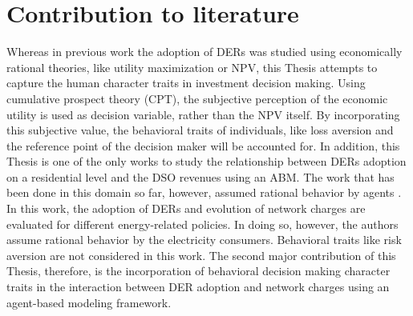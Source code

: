 \section{Contribution to literature}
Whereas in previous work the adoption of DERs was studied using economically rational theories, like utility maximization or NPV, this Thesis attempts to capture the human character traits in investment decision making. Using cumulative prospect theory (CPT), the subjective perception of the economic utility is used as decision variable, rather than the NPV itself. By incorporating this subjective value, the behavioral traits of individuals, like loss aversion and the reference point of the decision maker will be accounted for. 
\newline \newline \noindent
In addition, this Thesis is one of the only works to study the relationship between DERs adoption on a residential level and the DSO revenues using an ABM. The work that has been done in this domain so far, however, assumed rational behavior by agents \cite{Regulation}. In this work, the adoption of DERs and evolution of network charges are evaluated for different energy-related policies. In doing so, however, the authors assume rational behavior by the electricity consumers. Behavioral traits like risk aversion are not considered in this work. The second major contribution of this Thesis, therefore, is the incorporation of behavioral decision making character traits in the interaction between DER adoption and network charges using
an agent-based modeling framework.